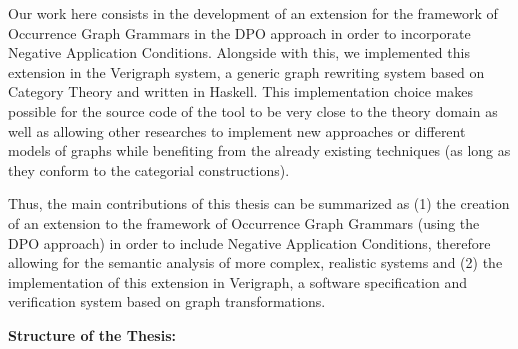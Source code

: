 Our work here consists in the development of an extension for the framework of Occurrence Graph Grammars in the DPO approach in order to incorporate Negative Application Conditions. Alongside with this, we implemented this extension in the Verigraph system, a generic graph rewriting system based on Category Theory and written in Haskell. This implementation choice makes possible for the source code of the tool to be very close to the theory domain as well as allowing other researches to implement new approaches or different models of graphs while benefiting from the already existing techniques (as long as they conform to the categorial constructions).



Thus, the main contributions of this thesis can be summarized as (1) the creation of an extension  to the framework of Occurrence Graph Grammars (using the DPO approach) in order to include Negative Application Conditions, therefore allowing for the semantic analysis of more complex, realistic systems and (2) the implementation of this extension in Verigraph, a software specification and verification system based on graph transformations.

\hfill \break
\textbf{Structure of the Thesis:}

